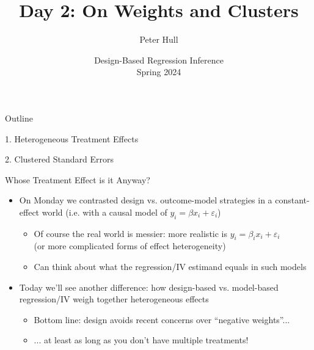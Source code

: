 \documentclass[11pt,english]{beamer}
\begin{document}
\begin{frame}[noframenumbering]{}
\vspace{0.5cm}
\title[]{Day 2: On Weights and Clusters}
\author{Peter Hull}
\date{Design-Based Regression Inference \\Spring 2024} 
\titlepage {\small{}\ }\thispagestyle{empty} \vspace{-30pt}

\end{frame}
 

\begin{frame}{Outline}

1. Heterogeneous Treatment Effects
\vspace{0.8cm}

2. Clustered Standard Errors

\end{frame}

\begin{frame}{Whose Treatment Effect is it Anyway?}
\begin{itemize}
\item On Monday we contrasted design vs. outcome-model strategies in a constant-effect world (i.e. with a causal model of $y_i=\beta x_i+\varepsilon_i$)\smallskip
\begin{itemize}
\item Of course the real world is messier: more realistic is $y_i=\beta_i x_i+\varepsilon_i$ \\ (or more complicated forms of effect heterogeneity) \smallskip\pause{}
\item Can think about what the regression/IV estimand equals in such models
\end{itemize}\bigskip\pause{}
\item Today we'll see another difference: how design-based vs. model-based regression/IV weigh together heterogeneous effects\smallskip
\begin{itemize}
\item Bottom line: design avoids recent concerns over ``negative weights''...\smallskip\pause{}
\item ... at least as long as you don't have multiple treatments! 
\end{itemize}
\end{itemize}
\end{frame}
\end{document}

